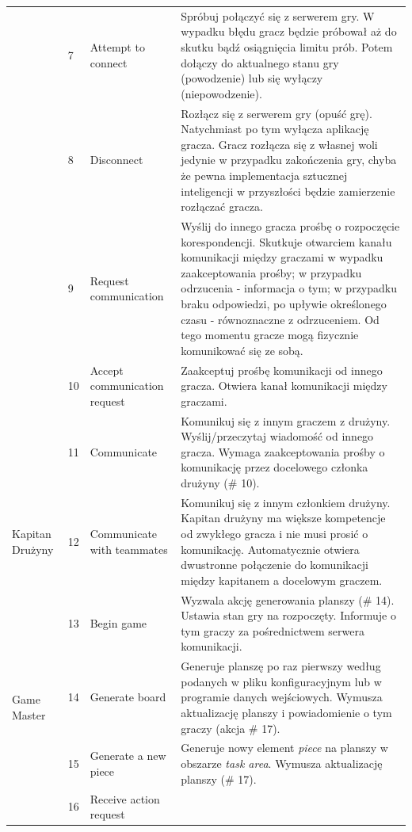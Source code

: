 \documentclass[11pt]{article}
\begin{document}
\begin{longtable}{|p{}|p{}|p{}|p{}|}
\\ \cline{2-4}
& 7 
& Attempt to connect 
& Spróbuj połączyć się z serwerem gry. W wypadku błędu gracz będzie próbował aż do skutku bądź osiągnięcia limitu prób. Potem dołączy do aktualnego stanu gry (powodzenie) lub się wyłączy (niepowodzenie).
\\ \cline{2-4}
& 8 
& Disconnect 
& Rozłącz się z serwerem gry (opuść grę). Natychmiast po tym wyłącza aplikację gracza. Gracz rozłącza się z własnej woli jedynie w przypadku zakończenia gry, chyba że pewna implementacja sztucznej inteligencji w przyszłości będzie zamierzenie rozłączać gracza.
\\ \cline{2-4}
& 9 
& Request communication 
& Wyślij do innego gracza prośbę o rozpoczęcie korespondencji. Skutkuje otwarciem kanału komunikacji między graczami w wypadku zaakceptowania prośby; w przypadku odrzucenia - informacja o tym; w przypadku braku odpowiedzi, po upływie określonego czasu - równoznaczne z odrzuceniem. Od tego momentu gracze mogą fizycznie komunikować się ze sobą.
\\ \cline{2-4}
& 10 
& Accept communication request 
& Zaakceptuj prośbę komunikacji od innego gracza. Otwiera kanał komunikacji między graczami.
\\ \cline{2-4}
& 11 
& Communicate 
& Komunikuj się z innym graczem z drużyny. Wyślij/przeczytaj wiadomość od innego gracza. Wymaga zaakceptowania prośby o komunikację przez docelowego członka drużyny (\# 10).
\\ \hline
Kapitan Drużyny 
& 12 
& Communicate with teammates 
& Komunikuj się z innym członkiem drużyny. Kapitan drużyny ma większe kompetencje od zwykłego gracza i nie musi prosić o komunikację. Automatycznie otwiera dwustronne połączenie do komunikacji między kapitanem a docelowym graczem. 
\\ \hline
\multirow{6}{.20\textwidth}{Game Master}
& 13
& Begin game
& Wyzwala akcję generowania planszy (\# 14). Ustawia stan gry na rozpoczęty. Informuje o tym graczy za pośrednictwem serwera komunikacji. 
\\ \cline{2-4}
& 14
& Generate board
& Generuje planszę po raz pierwszy według podanych w pliku konfiguracyjnym lub w programie danych wejściowych. Wymusza aktualizację planszy i powiadomienie o tym graczy (akcja \# 17).
\\ \cline{2-4}
& 15
& Generate a new piece
& Generuje nowy element \textit{piece} na planszy w obszarze \textit{task area}. Wymusza aktualizację planszy (\# 17).
\\ \cline{2-4}
& 16
& Receive action request

\end{longtable}
\end{document}

